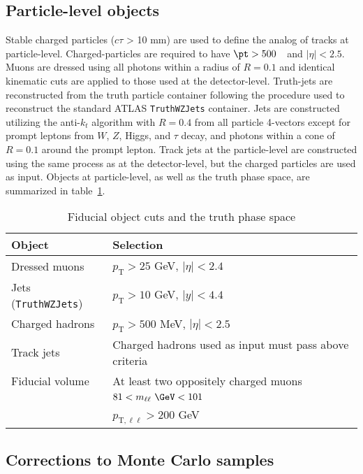 \subsection{Particle-level objects}

Stable charged particles ($c\tau$ > 10 mm) are used to define the analog of tracks at particle-level. Charged-particles are required to have $\pt > 500$~\MeV~and $|\eta|<2.5$.
Muons are dressed using all photons within a radius of $R=0.1$ and identical kinematic cuts are applied to those used at the detector-level. Truth-jets are reconstructed from the truth particle container following the procedure used to reconstruct the standard ATLAS \texttt{TruthWZJets} container. Jets are constructed utilizing the anti-$k_t$ algorithm with $R=0.4$ from all particle 4-vectors except for prompt leptons from $W$, $Z$, Higgs, and $\tau$ decay, and photons within a cone of $R=0.1$ around the prompt lepton.
Track jets at the particle-level are constructed using the same process as at the detector-level, but the charged particles are used as input.
Objects at particle-level, as well as the truth phase space, are summarized in table~\ref{tab:PLObjCuts}.

\begin{table}[h!]
    \centering
    \begin{tabular}{l|l}
    \hline
    \textbf{Object} & \textbf{Selection} \\ \hline
    Dressed muons & $p_\text{T} > 25$ GeV, $|\eta| < 2.4$ \\\hline
    Jets (\texttt{TruthWZJets}) & $p_\text{T} > 10$ GeV, $|y|<4.4$ \\\hline
    Charged hadrons & $p_\text{T}>500$ MeV, $|\eta|<2.5$  \\ \hline
    Track jets & Charged hadrons used as input must pass above criteria \\ \hline
    Fiducial volume & At least two oppositely charged muons \\
    & $81<m_{\ell\ell}~\GeV<101$ \\
    & $p_{\text{T},\ell\ell}>200$ GeV \\ \hline
    \end{tabular}
    \caption{Fiducial object cuts and the truth phase space}
    \label{tab:PLObjCuts}
\end{table}

\subsection{Corrections to Monte Carlo samples}
\label{subsec:MCCorr}
